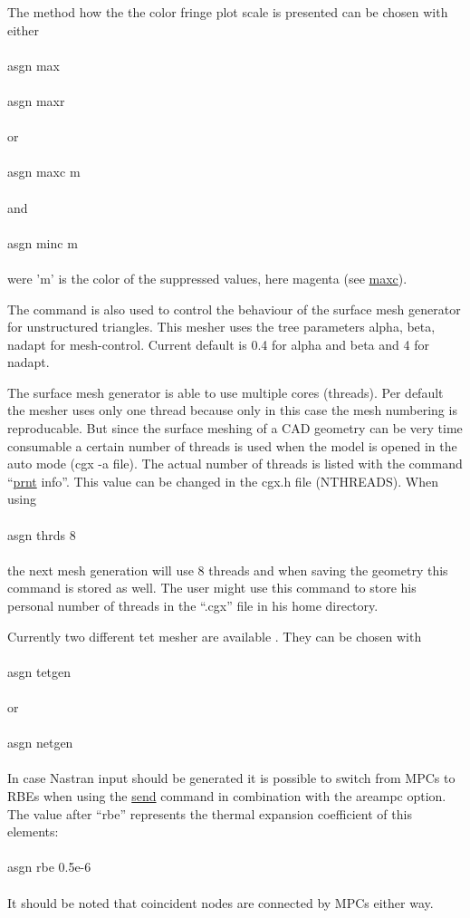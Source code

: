 \documentclass{article}
\providecommand{\htmlref}[2]{\hyperref[#2]{#1}}
\begin{document}
The method how the the color fringe plot scale is presented can be chosen with either\\\\asgn max\\\\asgn maxr\\\\or\\\\asgn maxc m\\\\and\\\\asgn minc m\\\\were 'm' is the color of the suppressed values, here magenta (see \htmlref{maxc}{maxc}). 

The command is also used to control the behaviour of the surface mesh generator for unstructured triangles. This mesher \cite{mesh2d} uses the tree parameters alpha, beta, nadapt for mesh-control. Current default is 0.4 for alpha and beta and 4 for nadapt.

The surface mesh generator is able to use multiple cores (threads). Per default the mesher uses only one thread because only in this case the mesh numbering is reproducable. But since the surface meshing of a CAD geometry can be very time consumable a certain number of threads is used when the model is opened in the auto mode (cgx -a file). The actual number of threads is listed with the command ``\htmlref{prnt}{prnt} info''. This value can be changed in the cgx.h file (NTHREADS). When using\\\\asgn thrds 8\\\\the next mesh generation will use 8 threads and when saving the geometry this command is stored as well. The user might use this command to store his personal number of threads in the ``.cgx'' file in his home directory.

Currently two different tet mesher are available \cite{NETGEN} \cite{TETGEN}. They can be chosen with\\\\asgn tetgen\\\\or\\\\asgn netgen\\\\
In case Nastran input should be generated it is possible to switch from MPCs to RBEs when using the \htmlref{send}{send} command in combination with the areampc option. The value after ``rbe'' represents the thermal expansion coefficient of this elements:\\\\asgn rbe 0.5e-6\\\\It should be noted that coincident nodes are connected by MPCs either way.
\end{document}
